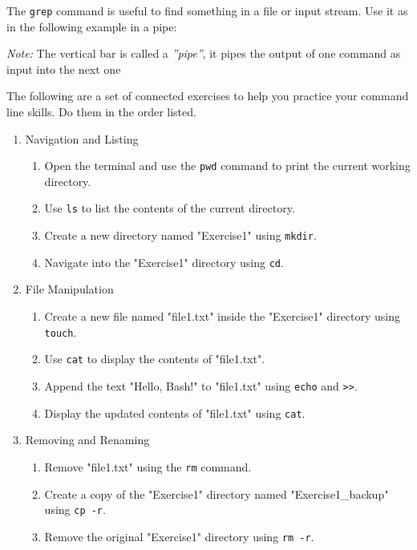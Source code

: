 \noindent The \texttt{grep} command is useful to find something in a file or input stream. Use it as in the following example in a pipe:

\noindent \emph{Note:} The vertical bar is called a \emph{''pipe''}, it pipes the output of one command as input into the next one

The following are a set of connected exercises to help you practice your command line skills. Do them in the order listed.

\begin{exercisebox}

\begin{enumerate}
\item Navigation and Listing
\begin{enumerate}[nosep]
	\item Open the terminal and use the \texttt{pwd} command to print the current working directory.
	\item Use \texttt{ls} to list the contents of the current directory.
	\item Create a new directory named "Exercise1" using \texttt{mkdir}.
	\item Navigate into the "Exercise1" directory using \texttt{cd}.
\end{enumerate}
\item File Manipulation
\begin{enumerate}
	\item Create a new file named "file1.txt" inside the "Exercise1" directory using \texttt{touch}.
	\item Use \texttt{cat} to display the contents of "file1.txt".
	\item Append the text "Hello, Bash!" to "file1.txt" using \texttt{echo} and \texttt{>>}.
	\item Display the updated contents of "file1.txt" using \texttt{cat}.
\end{enumerate}
\item Removing and Renaming
\begin{enumerate}
	\item Remove "file1.txt" using the \texttt{rm} command.
	\item Create a copy of the "Exercise1" directory named "Exercise1\_backup" using \texttt{cp -r}.
	\item Remove the original "Exercise1" directory using \texttt{rm -r}.

\end{enumerate}
\end{enumerate}
\end{exercisebox}
